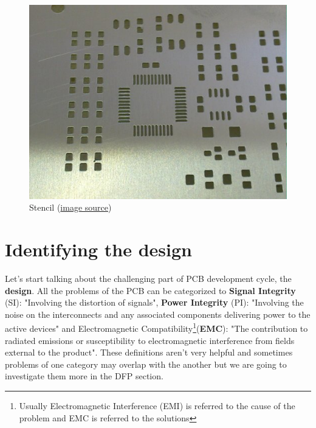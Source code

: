 \documentclass[final]{cubedoc}
\begin{document}
	
	\begin{figure}[h!]
		\centering
		\includegraphics[keepaspectratio, height = 0.25\textheight, width = \textwidth]{assets/solder_paste_stencil.jpg}
		\caption{Stencil \small{(\href{https://web.archive.org/web/20200814091107/https://www.itmconsulting.com/?product=stencilpro-3-0-stencil-aperture-calculator}{image source})}}
	\end{figure}
	
	\section{Identifying the design}
	
	
	Let's start talking about the challenging part of PCB development cycle, the \textbf{design}. All the problems of the PCB can be categorized to \textbf{Signal Integrity} (SI): "Involving the distortion of signals", \textbf{Power Integrity} (PI): "Involving the noise on the interconnects and any associated components delivering power to the active devices" and Electromagnetic Compatibility\footnote{Usually Electromagnetic Interference (EMI) is referred to the cause of the problem and EMC is referred to the solutions}(\textbf{EMC}): "The contribution to radiated emissions or susceptibility to electromagnetic interference from fields external to the product". These definitions aren't very helpful and sometimes problems of one category may overlap with the another but we are going to investigate them more in the DFP section.
	
\end{document}
